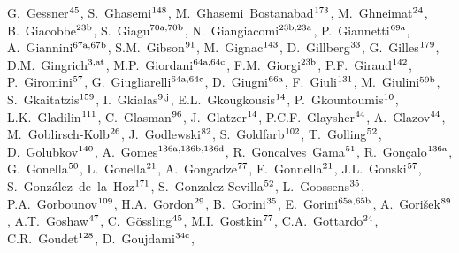 \begin{flushleft}
G.~Gessner$^\textrm{\scriptsize 45}$,    
S.~Ghasemi$^\textrm{\scriptsize 148}$,    
M.~Ghasemi~Bostanabad$^\textrm{\scriptsize 173}$,    
M.~Ghneimat$^\textrm{\scriptsize 24}$,    
B.~Giacobbe$^\textrm{\scriptsize 23b}$,    
S.~Giagu$^\textrm{\scriptsize 70a,70b}$,    
N.~Giangiacomi$^\textrm{\scriptsize 23b,23a}$,    
P.~Giannetti$^\textrm{\scriptsize 69a}$,    
A.~Giannini$^\textrm{\scriptsize 67a,67b}$,    
S.M.~Gibson$^\textrm{\scriptsize 91}$,    
M.~Gignac$^\textrm{\scriptsize 143}$,    
D.~Gillberg$^\textrm{\scriptsize 33}$,    
G.~Gilles$^\textrm{\scriptsize 179}$,    
D.M.~Gingrich$^\textrm{\scriptsize 3,at}$,    
M.P.~Giordani$^\textrm{\scriptsize 64a,64c}$,    
F.M.~Giorgi$^\textrm{\scriptsize 23b}$,    
P.F.~Giraud$^\textrm{\scriptsize 142}$,    
P.~Giromini$^\textrm{\scriptsize 57}$,    
G.~Giugliarelli$^\textrm{\scriptsize 64a,64c}$,    
D.~Giugni$^\textrm{\scriptsize 66a}$,    
F.~Giuli$^\textrm{\scriptsize 131}$,    
M.~Giulini$^\textrm{\scriptsize 59b}$,    
S.~Gkaitatzis$^\textrm{\scriptsize 159}$,    
I.~Gkialas$^\textrm{\scriptsize 9,j}$,    
E.L.~Gkougkousis$^\textrm{\scriptsize 14}$,    
P.~Gkountoumis$^\textrm{\scriptsize 10}$,    
L.K.~Gladilin$^\textrm{\scriptsize 111}$,    
C.~Glasman$^\textrm{\scriptsize 96}$,    
J.~Glatzer$^\textrm{\scriptsize 14}$,    
P.C.F.~Glaysher$^\textrm{\scriptsize 44}$,    
A.~Glazov$^\textrm{\scriptsize 44}$,    
M.~Goblirsch-Kolb$^\textrm{\scriptsize 26}$,    
J.~Godlewski$^\textrm{\scriptsize 82}$,    
S.~Goldfarb$^\textrm{\scriptsize 102}$,    
T.~Golling$^\textrm{\scriptsize 52}$,    
D.~Golubkov$^\textrm{\scriptsize 140}$,    
A.~Gomes$^\textrm{\scriptsize 136a,136b,136d}$,    
R.~Goncalves~Gama$^\textrm{\scriptsize 51}$,    
R.~Gon\c{c}alo$^\textrm{\scriptsize 136a}$,    
G.~Gonella$^\textrm{\scriptsize 50}$,    
L.~Gonella$^\textrm{\scriptsize 21}$,    
A.~Gongadze$^\textrm{\scriptsize 77}$,    
F.~Gonnella$^\textrm{\scriptsize 21}$,    
J.L.~Gonski$^\textrm{\scriptsize 57}$,    
S.~Gonz\'alez~de~la~Hoz$^\textrm{\scriptsize 171}$,    
S.~Gonzalez-Sevilla$^\textrm{\scriptsize 52}$,    
L.~Goossens$^\textrm{\scriptsize 35}$,    
P.A.~Gorbounov$^\textrm{\scriptsize 109}$,    
H.A.~Gordon$^\textrm{\scriptsize 29}$,    
B.~Gorini$^\textrm{\scriptsize 35}$,    
E.~Gorini$^\textrm{\scriptsize 65a,65b}$,    
A.~Gori\v{s}ek$^\textrm{\scriptsize 89}$,    
A.T.~Goshaw$^\textrm{\scriptsize 47}$,    
C.~G\"ossling$^\textrm{\scriptsize 45}$,    
M.I.~Gostkin$^\textrm{\scriptsize 77}$,    
C.A.~Gottardo$^\textrm{\scriptsize 24}$,    
C.R.~Goudet$^\textrm{\scriptsize 128}$,    
D.~Goujdami$^\textrm{\scriptsize 34c}$,    

\end{flushleft}
